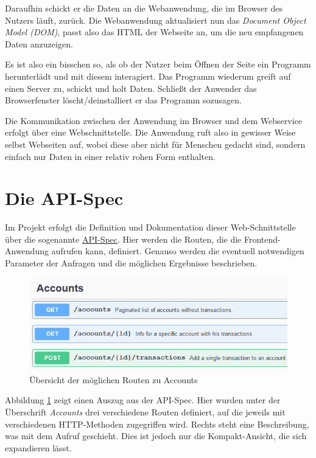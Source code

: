 \documentclass[a4paper, 11pt]{article}
\begin{document}
Daraufhin schickt er die Daten an die Webanwendung, die im Browser des Nutzers
läuft, zurück. Die Webanwendung aktualisiert nun das \emph{Document Object
Model (DOM)}, passt also das HTML der Webseite an, um die neu empfangenen Daten
anzuzeigen.

Es ist also ein bisschen so, als ob der Nutzer beim Öffnen der Seite ein
Programm herunterlädt und mit diesem interagiert. Das Programm wiederum greift
auf einen Server zu, schickt und holt Daten. Schließt der Anwender das
Browserfenster löscht/deinstalliert er das Programm sozusagen.

Die Kommunikation zwischen der Anwendung im Browser und dem Webservice erfolgt
über eine Webschnittstelle. Die Anwendung ruft also in gewisser Weise selbst
Webseiten auf, wobei diese aber nicht für Menschen gedacht sind, sondern
einfach nur Daten in einer relativ rohen Form enthalten.

\section{Die API-Spec}

Im Projekt erfolgt die Definition und Dokumentation dieser Web-Schnittstelle
über die sogenannte \href{https://wwi16ama.feste-ip.net/swagger/}{API-Spec}.
Hier werden die Routen, die die Frontend-Anwendung aufrufen kann, definiert.
Genauso werden die eventuell notwendigen Parameter der Anfragen und die
möglichen Ergebnisse beschrieben.  

\begin{figure}[htpb]
    \centering
    \includegraphics[width=\textwidth]{images/api_spec_example_short.png}
    \caption{Übersicht der möglichen Routen zu Accounts}
    \label{fig:api_spec_accs}
\end{figure}

Abbildung \ref{fig:api_spec_accs} zeigt einen Auszug aus der API-Spec. Hier
wurden unter der Überschrift \emph{Accounts} drei verschiedene Routen
definiert, auf die jeweils mit verschiedenen HTTP-Methoden zugegriffen wird.
Rechts steht eine Beschreibung, was mit dem Aufruf geschieht. Dies ist jedoch nur die Kompakt-Ansicht, die sich expandieren lässt.
\end{document}
